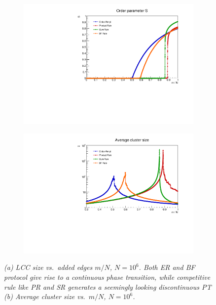 \begin{figure}
	\centering
	\begin{subfigure}[t]{0.48\linewidth}
		\includegraphics[width=\linewidth]{images/S.pdf}
		\vspace{-28pt}
		\caption{}
		\label{fig::S}
	\end{subfigure}
	\hspace{3pt}
	\begin{subfigure}[t]{0.48\linewidth}
		\includegraphics[width=\linewidth]{images/ACS.pdf}
		\vspace{-28pt}
		\caption{}
		\label{fig::ACS}
	\end{subfigure}
	\vspace{-10pt}
	\caption{\textit{(a) LCC size vs.\ added edges $m/N$, $N = 10^6$. Both ER and BF protocol give rise to a continuous phase transition, while competitive rule like PR and SR generates a seemingly looking discontinuous PT (b) Average cluster size vs.\ $m/N$, $N = 10^6$.}}
	\vspace{-8pt}
\end{figure}


